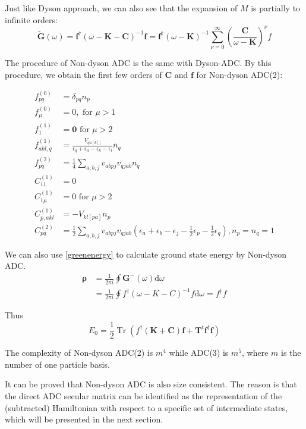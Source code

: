 Just like Dyson approach, we can also see that the expansion of $M$ is partially to infinite orders:
\begin{equation}
	\tilde{\boldsymbol{G}}(\omega)=\boldsymbol{f}^{\dagger}(\omega-\boldsymbol{K}-\boldsymbol{C})^{-1} \boldsymbol{f}=\boldsymbol{f}^{\dagger}(\omega-\boldsymbol{K})^{-1} \sum_{\nu=0}^{\infty}\left(\frac{\boldsymbol{C}}{\omega-\boldsymbol{K}}\right)^{\nu} f
\end{equation}

The procedure of Non-dyson ADC is the same with Dyson-ADC.
By this procedure, we obtain the first few orders of $\boldsymbol{C}$ and $\boldsymbol{f}$ for Non-dyson ADC(2):

\begin{equation}
	\begin{aligned}
		f_{p q}^{(0)}&=\delta_{p q} n_{p}
		\\
		f_{\mu}^{(0)}&=0, \text { for } \mu>1
		\\
		f_{1}^{(1)}&=\mathbf{0} \text { for } \mu>2
		\\
		f_{a k l, q}^{(1)}&=\frac{V_{q a[k] ]}}{\epsilon_{q}+\epsilon_{a}-\epsilon_{k}-\epsilon_{l}} \overline{n}_{q}
		\\
		f_{p q}^{(2)}&=\frac{1}{4} \sum_{a, b, j} v_{a b p j} v_{q j a b} n_{q}
		\\
		C_{11}^{(1)}&=0
		\\
		C_{1 \mu}^{(1)}&=0 \text { for } \mu>2
		\\
		C_{p, a k l}^{(1)}&=-V_{k l[p a]} n_{p}
		\\
		C_{p q}^{(2)}&=\frac{1}{2} \sum_{a, b, j} v_{a b p j} v_{q j a b}\left(\epsilon_{a}+\epsilon_{b}-\epsilon_{j}-\frac{1}{2} \epsilon_{p}-\frac{1}{2} \epsilon_{q}\right), n_{p}=n_{q}=1
	\end{aligned}
\end{equation}

We can also use \ref{greenenergy} to calculate ground state energy by Non-dyson ADC.
\begin{equation}
	\begin{aligned}
		\boldsymbol{\rho}&=\frac{1}{2 \pi i} \oint \boldsymbol{G}^{-}(\omega) \mathrm{d} \omega
		\\
		&=\frac{1}{2 \pi i} \oint f^{\dagger}(\omega-K-C)^{-1} f \mathrm{d} \omega=f^{\dagger} f
	\end{aligned}
\end{equation}

Thus
\begin{equation}
	E_{0}=\frac{1}{2} \operatorname{Tr}\left(f^{\dagger}(\boldsymbol{K}+\boldsymbol{C}) \boldsymbol{f}+\boldsymbol{T}^{t} \boldsymbol{f}^{\dagger} \boldsymbol{f}\right)
\end{equation}

The complexity of Non-dyson ADC(2) is $m^4$ while ADC(3) is $m^5$, where $m$ is the number of one particle basis.

It can be proved that Non-dyson ADC is also size consistent.
The reason is that the direct ADC secular matrix can be identified as the representation of the (subtracted) Hamiltonian with respect to a specific set of intermediate states, which will be presented in the next section.

